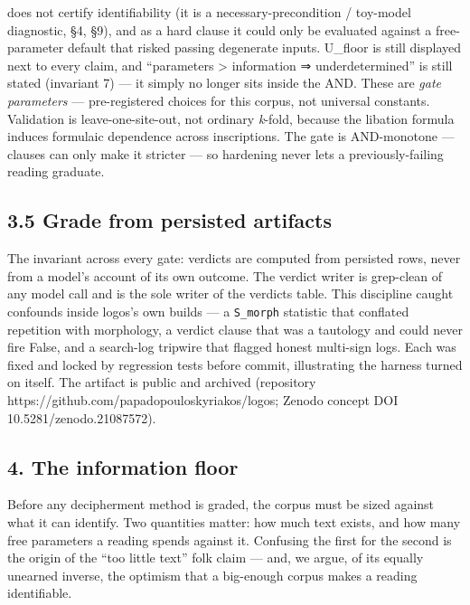 \documentclass[
  10pt,
]{article}
\begin{document}
does not certify identifiability (it is a necessary-precondition /
toy-model diagnostic, §4, §9), and as a hard clause it could only be
evaluated against a free-parameter default that risked passing
degenerate inputs. U\_floor is still displayed next to every claim, and
``parameters \textgreater{} information ⇒ underdetermined'' is still
stated (invariant 7) --- it simply no longer sits inside the AND. These
are \emph{gate parameters} --- pre-registered choices for this corpus,
not universal constants. Validation is leave-one-site-out, not ordinary
\emph{k}-fold, because the libation formula induces formulaic dependence
across inscriptions. The gate is AND-monotone --- clauses can only make
it stricter --- so hardening never lets a previously-failing reading
graduate.

\hypertarget{grade-from-persisted-artifacts}{%
\subsection{3.5 Grade from persisted
artifacts}\label{grade-from-persisted-artifacts}}

The invariant across every gate: verdicts are computed from persisted
rows, never from a model's account of its own outcome. The verdict
writer is grep-clean of any model call and is the sole writer of the
verdicts table. This discipline caught confounds inside logos's own
builds --- a \texttt{S\_morph} statistic that conflated repetition with
morphology, a verdict clause that was a tautology and could never fire
False, and a search-log tripwire that flagged honest multi-sign logs.
Each was fixed and locked by regression tests before commit,
illustrating the harness turned on itself. The artifact is public and
archived (repository https://github.com/papadopouloskyriakos/logos;
Zenodo concept DOI 10.5281/zenodo.21087572).

\hypertarget{the-information-floor}{%
\subsection{4. The information floor}\label{the-information-floor}}

Before any decipherment method is graded, the corpus must be sized
against what it can identify. Two quantities matter: how much text
exists, and how many free parameters a reading spends against it.
Confusing the first for the second is the origin of the ``too little
text'' folk claim --- and, we argue, of its equally unearned inverse,
the optimism that a big-enough corpus makes a reading identifiable.
\end{document}
